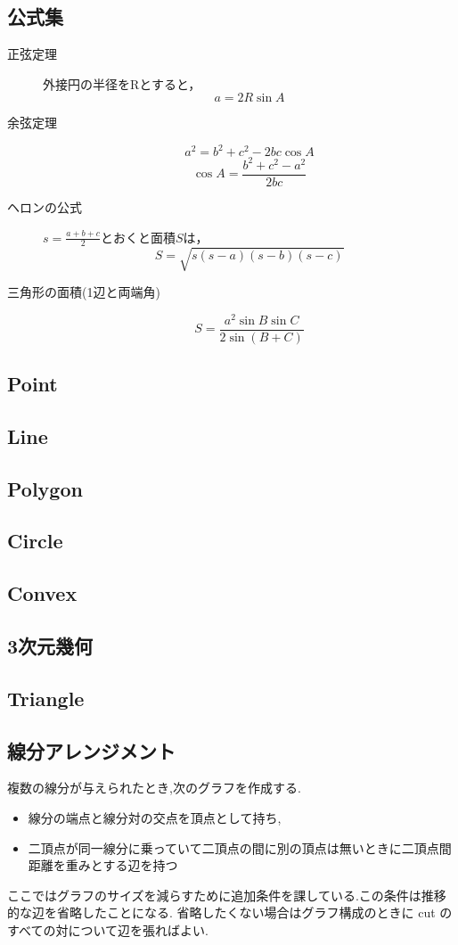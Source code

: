 \documentclass[landscape, twocolumn, 9pt]{jsarticle}
\begin{document}
\subsection{公式集}
\begin{description}
    \item[正弦定理]
        外接円の半径をRとすると，\[a = 2R\sin A\]
    \item[余弦定理]
        \[a^2 = b^2 + c^2 - 2bc\cos A\]
        \[\cos A = \frac{b^2 + c^2 - a^2}{2bc}\]
    \item[ヘロンの公式]
        $s = \frac{a + b + c}{2}$とおくと面積$S$は，
        \[S = \sqrt{s(s - a)(s - b)(s - c)}\]
    \item[三角形の面積(1辺と両端角)]
        \[S = \frac{a^2\sin B \sin C}{ 2\sin(B + C) }\]
\end{description}
\subsection{Point}

\subsection{Line}

\subsection{Polygon}

\subsection{Circle}


\subsection{Convex}

\subsection{3次元幾何}

\subsection{Triangle}

\subsection{線分アレンジメント}
 複数の線分が与えられたとき,次のグラフを作成する.
 \begin{itemize}
   \item 線分の端点と線分対の交点を頂点として持ち,
   \item 二頂点が同一線分に乗っていて二頂点の間に別の頂点は無いときに二頂点間距離を重みとする辺を持つ
 \end{itemize}
 ここではグラフのサイズを減らすために追加条件を課している.この条件は推移的な辺を省略したことになる.
 省略したくない場合はグラフ構成のときに cut のすべての対について辺を張ればよい.
\end{document}
